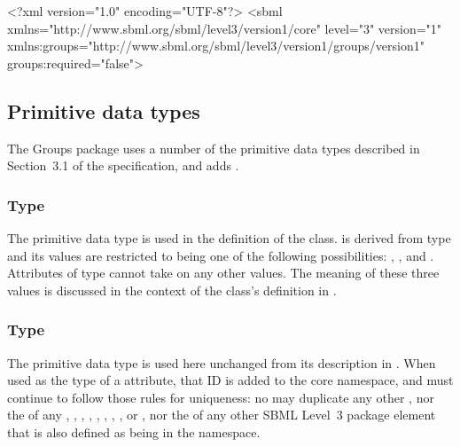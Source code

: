 \begin{example}
<?xml version="1.0" encoding="UTF-8"?>
<sbml xmlns="http://www.sbml.org/sbml/level3/version1/core" level="3" version="1"
      xmlns:groups="http://www.sbml.org/sbml/level3/version1/groups/version1"
      groups:required="false">
\end{example}


\subsection{Primitive data types}
\label{new-primitive-types}

The Groups package uses a number of the primitive data types described in Section~3.1 of the \sbmlthreecore specification,  and adds .


\subsubsection{Type \fixttspace{}}
\label{primtype-groupkind}

The  primitive data type is used in the definition of the \Group class.   is derived from type  and its values are restricted to being one of the following possibilities: , , and .  Attributes of type  cannot take on any other values.  The meaning of these three values is discussed in the context of the \Group class's definition in .


\begin{blockChanged}
\subsubsection{Type \fixttspace{}}
\label{primtype-sid}

The  primitive data type is used here unchanged from its description in \sbmlthreecore.  When used as the type of a  attribute, that ID is added to the core  namespace, and must continue to follow those rules for uniqueness: no  may duplicate any other , nor the  of any \Model, \FunctionDefinition, \Compartment, \Species, \Reaction, \SpeciesReference, \ModifierSpeciesReference, \Event, or \Parameter, nor the  of any other SBML Level~3 package element that is also defined as being in the  namespace.
\end{blockChanged}


